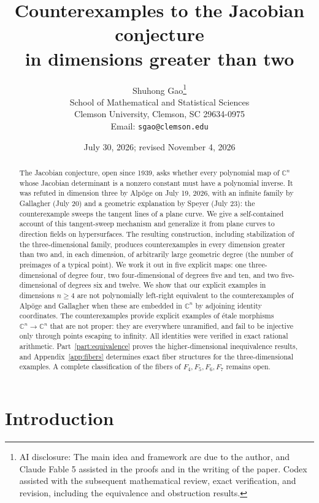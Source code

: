 \documentclass[11pt]{article}
\title{Counterexamples to the Jacobian conjecture\\ in dimensions greater than two}
\author{Shuhong Gao\thanks{AI disclosure: The main idea and framework are
due to the author, and Claude Fable 5 assisted in the proofs and in the writing
of the paper. Codex assisted with the subsequent mathematical review,
exact verification, and revision, including the equivalence and obstruction results.}\\[4pt]
\normalsize School of Mathematical and Statistical Sciences\\
Clemson University, Clemson, SC 29634-0975\\
Email: \texttt{sgao@clemson.edu}}
\date{July 30, 2026; revised November 4, 2026}
\numberwithin{equation}{section}
\theoremstyle{plain}
\theoremstyle{definition}
\theoremstyle{remark}
\newcommand{\C}{\mathbb{C}}
\begin{document}
\maketitle

\begin{abstract}
The Jacobian conjecture, open since 1939, asks whether every polynomial map of
$\C^n$ whose Jacobian determinant is a nonzero constant must have a polynomial
inverse. It was refuted in dimension three by Alp\"oge on July 19, 2026, with
an infinite family by Gallagher (July 20) and a geometric explanation by
Speyer (July 23): the counterexample sweeps the tangent lines of a plane
curve. We give a self-contained account of this tangent-sweep mechanism and
generalize it from plane curves to direction fields on hypersurfaces. The
resulting construction, including stabilization of the three-dimensional
family, produces counterexamples in every dimension greater
than two and, in each dimension, of arbitrarily large geometric degree (the
number of preimages of a typical point). We work it out in five explicit
maps: one three-dimensional of degree four, two four-dimensional of degrees
five and ten, and two five-dimensional of degrees six and twelve. We show
that our explicit examples in dimensions $n\ge4$ are not polynomially
left-right equivalent to the counterexamples of Alp\"oge and Gallagher
when these are embedded in $\C^n$ by adjoining identity coordinates. The
counterexamples provide explicit examples of \'etale morphisms
$\C^n\to\C^n$ that are not proper: they are everywhere unramified, and fail
to be injective only through points escaping to infinity. All identities were
verified in exact rational arithmetic. Part~\ref{part:equivalence} proves the
higher-dimensional inequivalence results, and Appendix~\ref{app:fibers}
determines exact fiber structures for the three-dimensional examples. A complete classification of the fibers of
$F_4,F_5,F_6,F_7$ remains open.
\end{abstract}

\clearpage
\tableofcontents
\clearpage

\section{Introduction}
\end{document}
